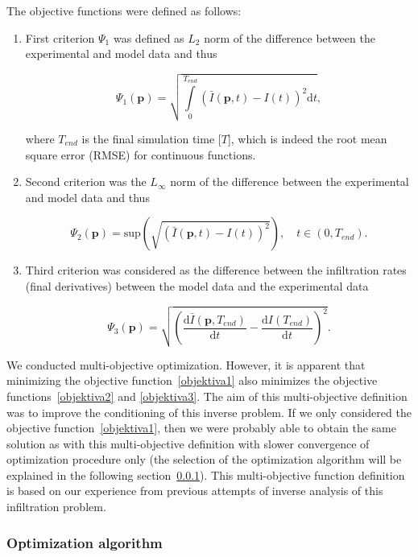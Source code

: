 \documentclass[review,times,3p,twocolumn,10pt]{elsarticle}
\newenvironment{lineq}
    {\begin{linenomath*}
    \begin{equation}
    }
    { 
    \end{equation} 
    \end{linenomath*}
    }
\newcommand{\dd}{\mathrm{d}}
\renewcommand{\vec}{\mathbf}
\begin{document}
The objective functions were defined as follows:
\begin{enumerate}[label={\bf \Roman*}.]
\item First criterion $\Psi_1$ was defined as $L_2$ norm of the difference between the  experimental and model data and thus
\begin{lineq}
\label{objektiva1}
\Psi_1 (\vec{p}) = \sqrt{\int\limits_0^{T_{end}} \left( \bar{I}(\vec{p},t) - I(t) \right)^2 \dd t},
\end{lineq}
where $T_{end}$ is the final simulation time [$T$], which is indeed the root mean square error (RMSE) for continuous functions. 
\item Second criterion was the $L_{\infty}$ norm of the difference between the experimental and model data and thus
\begin{lineq}
\label{objektiva2}
\Psi_2 (\vec{p}) = \mathrm{sup} \left( \sqrt{\left( \bar{I}(\vec{p},t) - I(t) \right)^2} \right), \quad  t \in (0, T_{end}).
\end{lineq}
\item Third criterion was considered as the difference between the infiltration rates (final derivatives) between the model data and the experimental data
\begin{lineq}
\label{objektiva3}
\Psi_3 (\vec{p}) =  \sqrt{\left( \frac{\dd \bar{I}(\vec{p},T_{end})}{\dd t} - \frac{\dd I(T_{end})}{\dd t} \right)^2}.
\end{lineq}


\end{enumerate}

We conducted multi-objective optimization. However, it is apparent that minimizing the objective function~\eqref{objektiva1} also minimizes the objective functions~\eqref{objektiva2} and \eqref{objektiva3}. The aim of this multi-objective definition was to improve the conditioning of this inverse problem. If we only considered the objective function~\eqref{objektiva1}, then we were probably able to obtain the same solution as with this multi-objective definition with slower convergence of optimization procedure only (the selection of the optimization algorithm will be explained in the following section~\ref{optima}). This multi-objective function definition is based on our experience from previous attempts of inverse analysis of this infiltration problem.



\subsubsection{Optimization algorithm}%
\label{optima}
\end{document}
